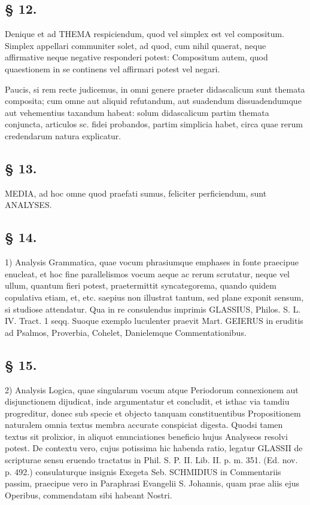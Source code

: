 \subsection*{§ 12.}

Denique et ad THEMA respiciendum, quod vel simplex est vel compositum. Simplex appellari communiter solet, ad quod, cum nihil quaerat, neque affirmative neque negative responderi potest: Compositum autem, quod quaestionem in se continens vel affirmari potest vel negari.

Paucis, si rem recte judicemus, in omni genere praeter didascalicum sunt themata composita; cum omne aut aliquid refutandum, aut suadendum dissuadendumque aut vehementius taxandum habeat: solum didascalicum partim themata conjuncta, articulos sc. fidei probandos, partim simplicia habet, circa quae rerum credendarum natura explicatur.

\subsection*{§ 13.}

MEDIA, ad hoc omne quod praefati sumus, feliciter perficiendum, sunt ANALYSES.

\subsection*{§ 14.}

1) Analysis Grammatica, quae vocum phrasiumque emphases in fonte praecipue enucleat, et hoc fine parallelismos vocum aeque ac rerum scrutatur, neque vel ullum, quantum fieri potest, praetermittit syncategorema, quando quidem copulativa etiam, et, etc. saepius non illustrat tantum, sed plane exponit sensum, si studiose attendatur. Qua in re consulendus imprimis GLASSIUS, Philos. S. L. IV. Tract. 1 seqq. Suoque exemplo luculenter praevit Mart. GEIERUS in eruditis ad Psalmos, Proverbia, Cohelet, Danielemque Commentationibus.

\subsection*{§ 15.}

2) Analysis Logica, quae singularum vocum atque Periodorum connexionem aut disjunctionem dijudicat, inde argumentatur et concludit, et isthac via tamdiu progreditur, donec sub specie et objecto tanquam constituentibus Propositionem naturalem omnia textus membra accurate conspiciat digesta. Quodsi tamen textus sit prolixior, in aliquot enunciationes beneficio hujus Analyseos resolvi potest. De contextu vero, cujus potissima hic habenda ratio, legatur GLASSII de scripturae sensu eruendo tractatus in Phil. S. P. II. Lib. II. p. m. 351. (Ed. nov. p. 492.) consulaturque insignis Exegeta Seb. SCHMIDIUS in Commentariis passim, praecipue vero in Paraphrasi Evangelii S. Johannis, quam prae aliis ejus Operibus, commendatam sibi habeant Nostri.

